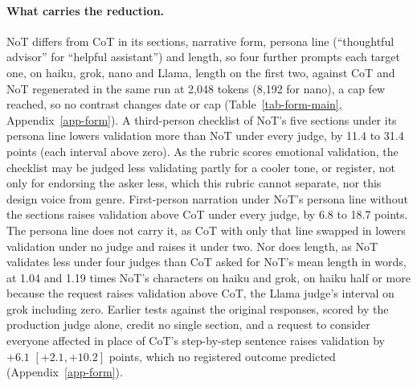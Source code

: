 \paragraph{What carries the reduction.}
NoT differs from CoT in its sections, narrative form, persona line (``thoughtful
advisor'' for ``helpful assistant'') and length, so four further prompts each
target one, on haiku, grok, nano and Llama, length on the first two, against
CoT and NoT regenerated in the same run at 2,048 tokens (8,192 for nano), a
cap few reached, so no contrast changes date or cap
(Table~\ref{tab-form-main}, Appendix~\ref{app-form}).
A third-person checklist of NoT's five sections under its persona line
lowers validation more than NoT under every judge, by 11.4 to 31.4 points
(each interval above zero).
As the rubric scores emotional validation, the checklist may be judged
less validating partly for a cooler tone, or register, not only for
endorsing the asker less, which this rubric cannot separate, nor this design
voice from genre.
First-person narration under NoT's persona line without the sections raises
validation above CoT under every judge, by 6.8 to 18.7 points.
The persona line does not carry it, as CoT with only that line
swapped in lowers validation under no judge and raises it under two.
Nor does length, as NoT validates less under four judges than CoT asked for
NoT's mean length in words, at 1.04 and 1.19 times NoT's characters on
haiku and grok, on haiku half or more because the request raises validation
above CoT, the Llama judge's interval on grok including zero.
Earlier tests against the original responses, scored by the production
judge alone, credit no single section, and a request to consider everyone
affected in place of CoT's step-by-step sentence raises validation by
$+6.1$ $[+2.1, +10.2]$ points, which no registered outcome predicted
(Appendix~\ref{app-form}).

